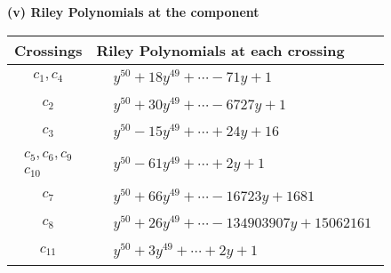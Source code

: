 \documentclass[1p]{elsarticle_modified}
\theoremstyle{definition}
\begin{document}
\newpage\renewcommand{\arraystretch}{1}
\flushleft \textbf{(v) Riley Polynomials at the component}\newline \\
\begin{tabular}{m{50pt}|m{274pt}}
Crossings & \hspace{64pt}Riley Polynomials at each crossing \\
\hline $$\begin{aligned}c_{1},c_{4}\end{aligned}$$&$\begin{aligned}
&y^{50}+18 y^{49}+\cdots-71 y+1
\end{aligned}$\\
\hline $$\begin{aligned}c_{2}\end{aligned}$$&$\begin{aligned}
&y^{50}+30 y^{49}+\cdots-6727 y+1
\end{aligned}$\\
\hline $$\begin{aligned}c_{3}\end{aligned}$$&$\begin{aligned}
&y^{50}-15 y^{49}+\cdots+24 y+16
\end{aligned}$\\
\hline $$\begin{aligned}c_{5},c_{6},c_{9}\\c_{10}\end{aligned}$$&$\begin{aligned}
&y^{50}-61 y^{49}+\cdots+2 y+1
\end{aligned}$\\
\hline $$\begin{aligned}c_{7}\end{aligned}$$&$\begin{aligned}
&y^{50}+66 y^{49}+\cdots-16723 y+1681
\end{aligned}$\\
\hline $$\begin{aligned}c_{8}\end{aligned}$$&$\begin{aligned}
&y^{50}+26 y^{49}+\cdots-134903907 y+15062161
\end{aligned}$\\
\hline $$\begin{aligned}c_{11}\end{aligned}$$&$\begin{aligned}
&y^{50}+3 y^{49}+\cdots+2 y+1
\end{aligned}$\\
\hline
\end{tabular}\\~\\
\end{document}
